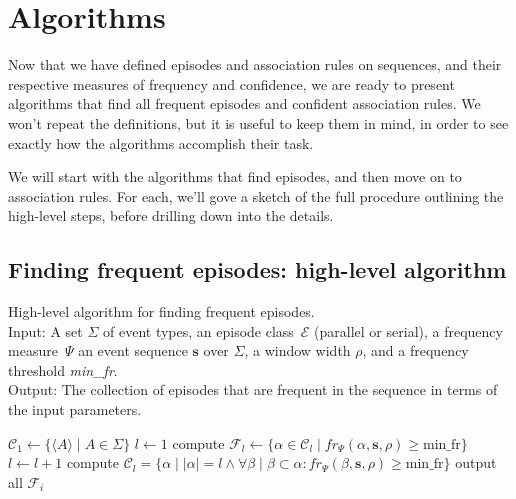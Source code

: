 \chapter{Algorithms}
\label{sec:algorithms}

Now that we have defined episodes and association rules on sequences, and their respective measures of frequency and confidence, we are ready to present algorithms that find all frequent episodes and confident association rules. We won't repeat the definitions, but it is useful to keep them in mind, in order to see exactly how the algorithms accomplish their task.

We will start with the algorithms that find episodes, and then move on to association rules. For each, we'll gove a sketch of the full procedure outlining the high-level steps, before drilling down into the details.

\section{Finding frequent episodes: high-level algorithm}

\begin{algorithm}

\caption{High-level algorithm for finding frequent episodes. \\
Input: A set $ \Sigma $ of event types, an episode class~$ \mathcal{E} $ (parallel or serial), a frequency measure~$ \Psi $ an event sequence $ \boldsymbol{s} $ over $ \Sigma $, a window width $ \rho $, and a frequency threshold \emph{min\_fr}. \\
Output: The collection of episodes that are frequent in the sequence in terms of the input parameters.
}

\begin{algorithmic}[1]

\State $ \mathcal{C}_1 \gets \{ \langle A \rangle \mid A \in \Sigma \} $
\State $ l \gets 1 $
    \State compute $ \mathcal{F}_l \gets \{ \alpha \in \mathcal{C}_l \mid fr_\Psi(\alpha, \boldsymbol{s}, \rho) \geq \text{min\_fr} \} $
    \State $ l \gets l + 1 $
    \State compute $ \mathcal{C}_l = \{ \alpha \mid | \alpha | = l \wedge \forall \beta \mid \beta \subset \alpha : fr_\Psi(\beta, \boldsymbol{s}, \rho) \geq \text{min\_fr} \} $
\EndWhile
\State output all $ \mathcal{F}_i $

\end{algorithmic}

\label{alg:episodes-top-level}
\end{algorithm}

